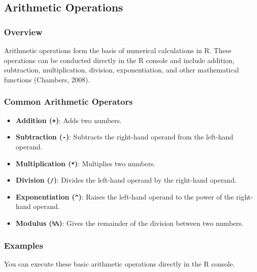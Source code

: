 \documentclass[
]{book}
\providecommand{\tightlist}{%
  \setlength{\itemsep}{0pt}\setlength{\parskip}{0pt}}
\begin{document}
\subsection*{Arithmetic Operations}\label{arithmetic-operations}

\subsubsection*{Overview}\label{overview}

Arithmetic operations form the basis of numerical calculations in R. These operations can be conducted directly in the R console and include addition, subtraction, multiplication, division, exponentiation, and other mathematical functions (Chambers, 2008).

\subsubsection*{Common Arithmetic Operators}\label{common-arithmetic-operators}

\begin{itemize}
\tightlist
\item
  \textbf{Addition (\texttt{+})}: Adds two numbers.
\item
  \textbf{Subtraction (\texttt{-})}: Subtracts the right-hand operand from the left-hand operand.
\item
  \textbf{Multiplication (\texttt{*})}: Multiplies two numbers.
\item
  \textbf{Division (\texttt{/})}: Divides the left-hand operand by the right-hand operand.
\item
  \textbf{Exponentiation (\texttt{\^{}})}: Raises the left-hand operand to the power of the right-hand operand.
\item
  \textbf{Modulus (\texttt{\%\%})}: Gives the remainder of the division between two numbers.
\end{itemize}

\subsubsection*{Examples}\label{examples}

You can execute these basic arithmetic operations directly in the R console.
\end{document}
